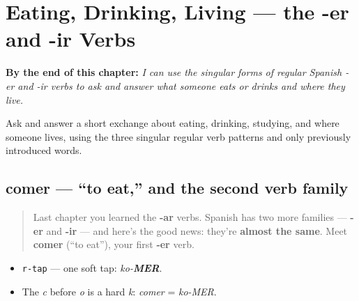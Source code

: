 
\chapter{Eating, Drinking, Living --- the -er and -ir Verbs}
\label{ch:er-ir-verbs}

\begin{chapteropening}
\textbf{By the end of this chapter:} \emph{I can use the singular forms of regular Spanish -er and -ir verbs to ask and answer what someone eats or drinks and where they live.}

Ask and answer a short exchange about eating, drinking, studying, and where someone lives, using the three singular regular verb patterns and only previously introduced words.
\end{chapteropening}

\section[comer]{comer — \textquotedblleft{}to eat,\textquotedblright{} and the second verb family}

\label{lesson:ES-C07-comer}



\begin{quote}
Last chapter you learned the \textbf{-ar} verbs. Spanish has two more families — \textbf{-er} and \textbf{-ir} — and here's the good news: they're \textbf{almost the same}. Meet \textbf{comer} (\textquotedblleft{}to eat\textquotedblright{}), your first \textbf{-er} verb.
\end{quote}

\begin{sounds}
\begin{itemize}
\raggedright
  \item \texttt{r-tap} — one soft tap: \emph{ko-\textbf{MER}}.
  \item The \emph{c} before \emph{o} is a hard \emph{k}: \emph{comer} = \emph{ko-MER}.
\end{itemize}
\end{sounds}

